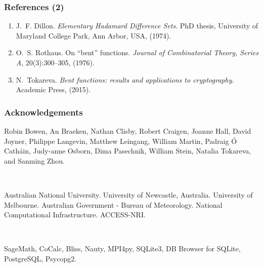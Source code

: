 \documentclass[pdf,sprung,slideColor,nocolorBG]{beamer}
\newenvironment{colortheme}[1]{
\def\ProvidesPackageRCS $##1${\relax}
\renewcommand{\ProcessOptions}{\relax}
\makeatletter

\makeatother
}{}
\begin{document}
\begin{colortheme}{access}
\begin{frame}
\frametitle{References (2)}
\small{}
\begin{enumerate}
\setcounter{enumi}{\value{enumisave}}
 \item
J.~F. Dillon.
{\em Elementary {Hadamard} Difference Sets}.
PhD thesis, University of Maryland College Park, Ann Arbor, USA,
  (1974).
 \item
O.~S. Rothaus.
On ``bent'' functions.
{\em Journal of Combinatorial Theory, Series A}, 20(3):300--305,
  (1976).
 \item
N.~Tokareva.
{\em Bent functions: results and applications to cryptography}.
Academic Press, (2015).
\end{enumerate}

\end{frame}
\begin{frame}
\frametitle{Acknowledgements}
Robin Bowen,
An Braeken,
Nathan Clisby,
Robert Craigen,
Joanne Hall,
David Joyner,
Philippe Langevin,
Matthew Leingang,
William Martin,
Padraig {\'O} Cath{\'a}in,
Judy-anne Osborn,
Dima Pasechnik,
William Stein,
Natalia Tokareva, and
Sanming Zhou.

~

Australian National University. University of Newcastle, Australia. University of Melbourne.
Australian Government - Bureau of Meteorology.
National Computational Infrastructure. ACCESS-NRI.

~

SageMath, CoCalc, Bliss, Nauty, MPI4py, SQLite3, DB Browser for SQLite, PostgreSQL, Psycopg2.
\end{frame}

\end{colortheme}
\end{document}
